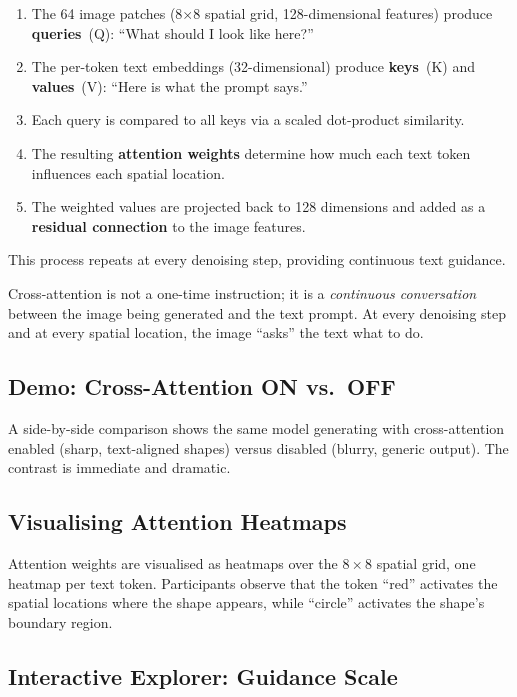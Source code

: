 \documentclass[11pt,a4paper]{article}
\begin{document}
\begin{enumerate}[nosep]
  \item The 64 image patches (8$\times$8 spatial grid, 128-dimensional
        features) produce \textbf{queries}~(Q): ``What should I look
        like here?''
  \item The per-token text embeddings (32-dimensional) produce
        \textbf{keys}~(K) and \textbf{values}~(V): ``Here is what the
        prompt says.''
  \item Each query is compared to all keys via a scaled dot-product
        similarity.
  \item The resulting \textbf{attention weights} determine how much each
        text token influences each spatial location.
  \item The weighted values are projected back to 128 dimensions and
        added as a \textbf{residual connection} to the image features.
\end{enumerate}

This process repeats at every denoising step, providing continuous
text guidance.

\begin{keyinsight}
Cross-attention is not a one-time instruction; it is a \emph{continuous
conversation} between the image being generated and the text prompt.  At
every denoising step and at every spatial location, the image ``asks''
the text what to do.
\end{keyinsight}

\subsection{Demo: Cross-Attention ON vs.\ OFF}

A side-by-side comparison shows the same model generating with
cross-attention enabled (sharp, text-aligned shapes) versus disabled
(blurry, generic output).  The contrast is immediate and dramatic.

\subsection{Visualising Attention Heatmaps}

Attention weights are visualised as heatmaps over the $8 \times 8$
spatial grid, one heatmap per text token.  Participants observe that the
token ``red'' activates the spatial locations where the shape appears,
while ``circle'' activates the shape's boundary region.

\subsection{Interactive Explorer: Guidance Scale}
\end{document}
